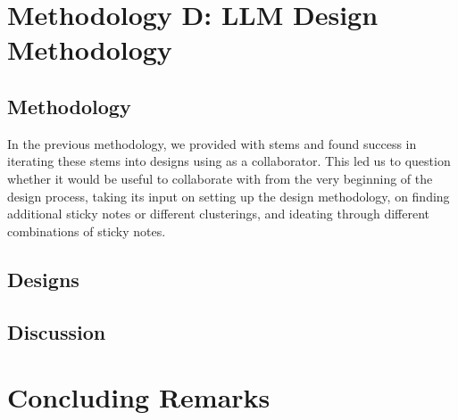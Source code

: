
\section{Methodology D: LLM Design Methodology}
\label{sec:meth4}

\subsection{Methodology}


In the previous methodology, we provided \gpt with stems and found success in iterating these stems into designs using \gpt as a collaborator.  This led us to question whether it would be useful to collaborate with \gpt from the very beginning of the design process, taking its input on setting up the design methodology, on finding additional sticky notes or different clusterings, and ideating through different combinations of sticky notes.

\subsection{Designs}


\subsection{Discussion}



\section{Concluding Remarks}




